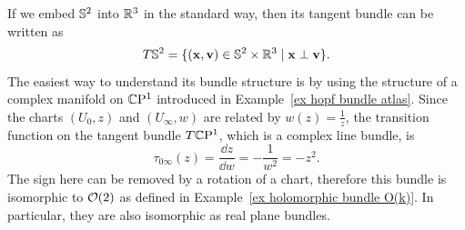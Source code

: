 \begin{example}\label{ex tangent bundle of S2}
    If we embed $\mathbb{S}^2$ into $\mathbb{R}^3$ in the standard way, then its tangent bundle can be written as
    \[T\mathbb{S}^2=\{(\mathbf{x},\mathbf{v})\in \mathbb{S}^2\times\mathbb{R}^3\mid \mathbf{x}\perp\mathbf{v}\}.\label{eq TS2 in R3}\]
    The easiest way to understand its bundle structure is by using the structure of a complex manifold on $\mathbb{C}\mathrm{P}^1$ introduced in Example~\ref{ex hopf bundle atlas}. Since the charts $(U_0,z)$ and $(U_\infty,w)$ are related by $w(z)=\frac{1}{z}$, the transition function on the tangent bundle $T\mathbb{C}\mathrm{P}^1$, which is a complex line bundle, is 
    \[\tau_{0\infty}(z)=\frac{\dd z}{\dd w}=-\frac{1}{w^2}=-z^2.\]
    The sign here can be removed by a rotation of a chart, therefore this bundle is isomorphic to $\mathcal{O}(2)$ as defined in Example~\ref{ex holomorphic bundle O(k)}. In particular, they are also isomorphic as real plane bundles.


\end{example}
